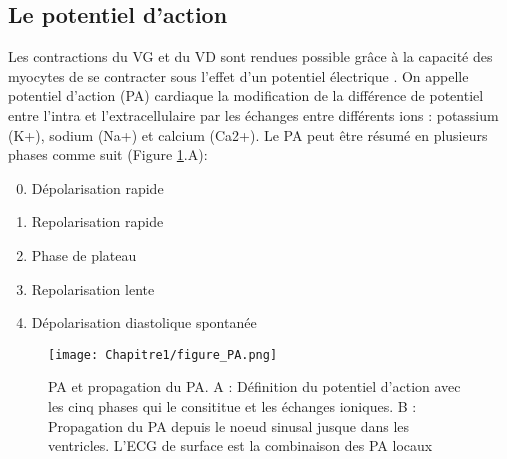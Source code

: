 \subsection{Le potentiel d'action}



Les contractions du VG et du VD sont rendues possible grâce à la capacité des myocytes de se contracter sous l’effet d’un 
potentiel électrique \cite{renard:tel-04344684}. On appelle potentiel d’action (PA) cardiaque 
la modification de la différence de potentiel entre l’intra et l’extracellulaire par les échanges entre 
différents ions : potassium (K+), sodium (Na+) et calcium (Ca2+). Le PA peut être résumé en plusieurs phases comme
 suit  (Figure \ref{fig:fig_PA}.A): 

\begin{enumerate}
\setcounter{enumi}{-1}
\item Dépolarisation rapide
\item Repolarisation rapide
\item Phase de plateau
\item Repolarisation lente
\item Dépolarisation diastolique spontanée
\end{enumerate}

\begin{figure}[!htbp]
  \begin{center}
    \texttt{[image: Chapitre1/figure\_PA.png]}
     \end{center}
    \caption{PA et propagation du PA. A : Définition du potentiel d'action avec les cinq phases qui le consititue et les échanges ioniques. B : Propagation du PA depuis le noeud sinusal jusque dans les ventricles. L'ECG de surface est la combinaison des PA locaux}
  \label{fig:fig_PA}
\end{figure}

